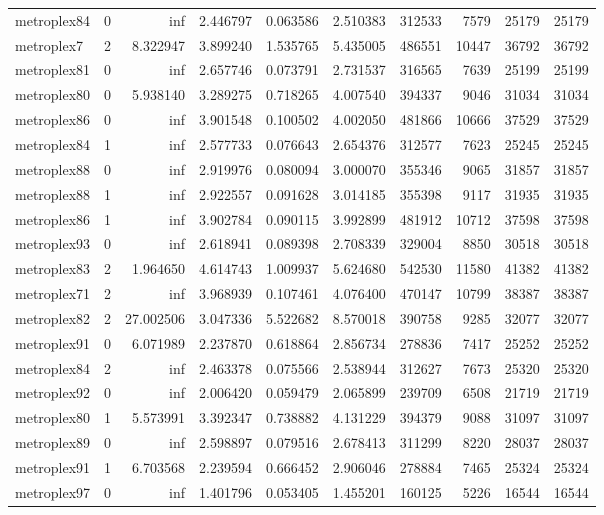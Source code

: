 \begin{longtable}{|l|r|r|r|r|r|r|r|r|r|}
metroplex84 & 0 & inf & 2.446797 & 0.063586 & 2.510383 & 312533 & 7579 & 25179 & 25179 \\
metroplex7 & 2 & 8.322947 & 3.899240 & 1.535765 & 5.435005 & 486551 & 10447 & 36792 & 36792 \\
metroplex81 & 0 & inf & 2.657746 & 0.073791 & 2.731537 & 316565 & 7639 & 25199 & 25199 \\
metroplex80 & 0 & 5.938140 & 3.289275 & 0.718265 & 4.007540 & 394337 & 9046 & 31034 & 31034 \\
metroplex86 & 0 & inf & 3.901548 & 0.100502 & 4.002050 & 481866 & 10666 & 37529 & 37529 \\
metroplex84 & 1 & inf & 2.577733 & 0.076643 & 2.654376 & 312577 & 7623 & 25245 & 25245 \\
metroplex88 & 0 & inf & 2.919976 & 0.080094 & 3.000070 & 355346 & 9065 & 31857 & 31857 \\
metroplex88 & 1 & inf & 2.922557 & 0.091628 & 3.014185 & 355398 & 9117 & 31935 & 31935 \\
metroplex86 & 1 & inf & 3.902784 & 0.090115 & 3.992899 & 481912 & 10712 & 37598 & 37598 \\
metroplex93 & 0 & inf & 2.618941 & 0.089398 & 2.708339 & 329004 & 8850 & 30518 & 30518 \\
metroplex83 & 2 & 1.964650 & 4.614743 & 1.009937 & 5.624680 & 542530 & 11580 & 41382 & 41382 \\
metroplex71 & 2 & inf & 3.968939 & 0.107461 & 4.076400 & 470147 & 10799 & 38387 & 38387 \\
metroplex82 & 2 & 27.002506 & 3.047336 & 5.522682 & 8.570018 & 390758 & 9285 & 32077 & 32077 \\
metroplex91 & 0 & 6.071989 & 2.237870 & 0.618864 & 2.856734 & 278836 & 7417 & 25252 & 25252 \\
metroplex84 & 2 & inf & 2.463378 & 0.075566 & 2.538944 & 312627 & 7673 & 25320 & 25320 \\
metroplex92 & 0 & inf & 2.006420 & 0.059479 & 2.065899 & 239709 & 6508 & 21719 & 21719 \\
metroplex80 & 1 & 5.573991 & 3.392347 & 0.738882 & 4.131229 & 394379 & 9088 & 31097 & 31097 \\
metroplex89 & 0 & inf & 2.598897 & 0.079516 & 2.678413 & 311299 & 8220 & 28037 & 28037 \\
metroplex91 & 1 & 6.703568 & 2.239594 & 0.666452 & 2.906046 & 278884 & 7465 & 25324 & 25324 \\
metroplex97 & 0 & inf & 1.401796 & 0.053405 & 1.455201 & 160125 & 5226 & 16544 & 16544 \\

\end{longtable}
